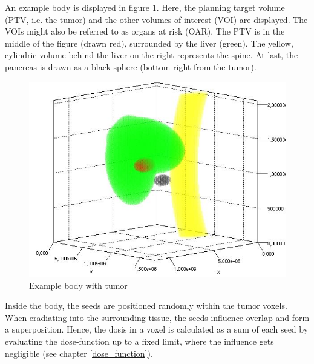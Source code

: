 \documentclass[12pt]{article}
\begin{document}
An example body is displayed in figure \ref{model:body}. Here, the planning target volume (PTV, i.e. the tumor) and the other volumes of interest (VOI) are displayed. The VOIs might also be referred to as organs at risk (OAR). The PTV is in the middle of the figure (drawn red), surrounded by the liver (green). The yellow, cylindric volume behind the liver on the right represents the spine. At last, the pancreas is drawn as a black sphere (bottom right from the tumor).
\begin{figure}
\centering
\includegraphics[width=.7\textwidth]{pictures/body}
\caption{Example body with tumor}
\label{model:body}
\end{figure}

Inside the body, the seeds are positioned randomly within the tumor voxels. When eradiating into the surrounding tissue, the seeds influence overlap and form a superposition. Hence, the dosis in a voxel is calculated as a sum of each seed by evaluating the dose-function up to a fixed limit, where the influence gets negligible (see chapter \ref{dose_function}).
\end{document}

